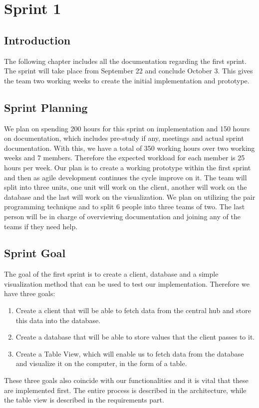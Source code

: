 \documentclass[../document.tex]{subfiles}
\begin{document}
\section{Sprint 1}

\subsection{Introduction}
The following chapter includes all the documentation regarding the first sprint. The sprint will take place from September 22 and conclude October 3. This gives the team two working weeks to create the initial implementation and prototype.

\subsection{Sprint Planning}
We plan on spending 200 hours for this sprint on implementation and 150 hours on documentation, which includes pre-study if any, meetings and actual sprint documentation. With this, we have a total of 350 working hours over two working weeks and 7 members. Therefore the expected workload for each member is 25 hours per week. Our plan is to create a working prototype within the first sprint and then as agile development continues the cycle improve on it. The team will split into three units, one unit will work on the client, another will work on the database and the last will work on the visualization. We plan on utilizing the pair programming technique and to split 6 people into three teams of two. The last person will be in charge of overviewing documentation and joining any of the teams if they need help.

\subsection{Sprint Goal}
The goal of the first sprint is to create a client, database and a simple visualization method that can be used to test our implementation. Therefore we have three goals:
\begin{enumerate}
\item
Create a client that will be able to fetch data from the central hub and store this data into the database.
\item
Create a database that will be able to store values that the client passes to it.
\item
Create a Table View, which will enable us to fetch data from the database and visualize it on the computer, in the form of a table.
\end{enumerate}
These three goals also coincide with our functionalities and it is vital that these are implemented first. The entire process is described in the architecture, while the table view is described in the requirements part.
\end{document}
